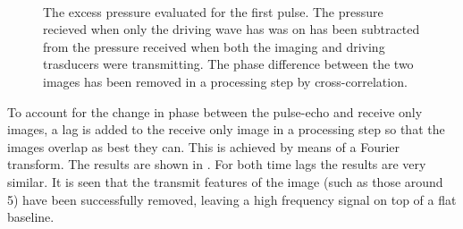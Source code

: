 \begin{figure}[t]%
  \centering
 \quad
  \subfloat[1st pulse - 150]{
    \label{fig:exp:1st:av:time:150:comp:control:cross:full}
    }
 \quad
  \subfloat[1st pulse - 150]{
    \label{fig:exp:1st:av:time:150:comp:control:cross:det}
    }\\
 \quad
  \subfloat[1st pulse - 250]{
    \label{fig:exp:1st:av:time:250:comp:control:cross:full}
    }
 \quad
  \subfloat[1st pulse - 250]{
    \label{fig:exp:1st:av:time:250:comp:control:cross:det}
    }
\caption{
    The excess pressure evaluated for the first pulse.  
    The pressure recieved when only the driving wave has was on has been subtracted from the pressure received when both the imaging and driving trasducers were transmitting.
    The phase difference between the two images has been removed in a processing step by cross-correlation.
  }
  \label{fig:exp:1st:av:time:comp:control:cross}
\end{figure}

To account for the change in phase between the pulse-echo and receive only images,
a lag is added to the receive only image in a processing step so that the images 
overlap as best they can.  
This is achieved by means of a Fourier transform.
The results are shown in .
For both time lags the results are very similar.
It is seen that the transmit features of the image (such as those around \unit{5}\micro\second) 
have been successfully removed, leaving a high frequency signal on top of a flat baseline.

